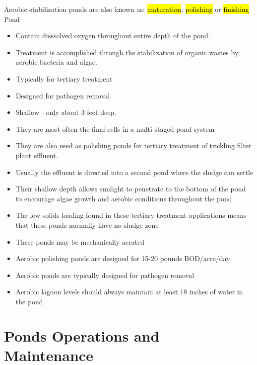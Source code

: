 Aerobic stabilization ponds are also known as: \hl{maturation}, \hl{polishing} or \hl{finishing} Pond
\begin{itemize}
\item Contain disssolved oxygen throughout entire depth of the pond.
\item Treatment is accomplished through the stabilization of organic wastes by aerobic bacteria and algae.
\item Typically for tertiary treatment
\item Designed for pathogen removal
\item Shallow - only about 3 feet deep. 
\item They are most often the final cells in a multi-staged pond system
\item They are also used as polishing ponds for tertiary treatment of trickling filter plant effluent.
\item Usually the effluent is directed into a second pond where the sludge can settle 
\item Their shallow depth allows sunlight to penetrate to the bottom of the pond to encourage algae growth and aerobic conditions throughout the pond 
\item The low solids loading found in these tertiary treatment applications means that these ponds normally have no sludge zone
\item These ponds may be mechanically aerated 
\item Aerobic polishing ponds are designed for 15-20 pounds BOD/acre/day
\item Aerobic ponds are typically designed for pathogen removal
\item Aerobic lagoon levels should always maintain at least 18 inches of water in the pond
\end{itemize}



\section{Ponds Operations and Maintenance}

